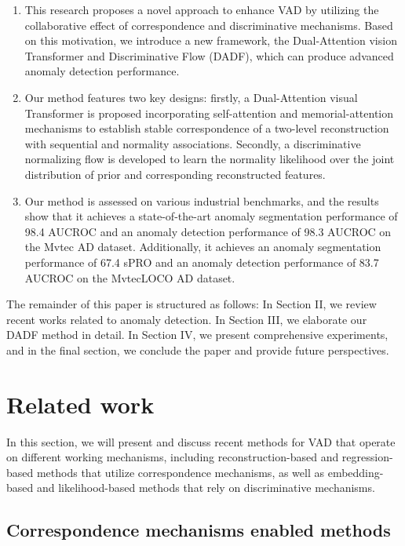 \documentclass[journal]{IEEEtran}
\begin{document}
\begin{enumerate}
\item This research proposes a novel approach to enhance VAD by utilizing the collaborative effect of correspondence and discriminative mechanisms. Based on this motivation, we introduce a new framework, the Dual-Attention vision Transformer and Discriminative Flow (DADF), which can produce advanced anomaly detection performance.

\item Our method features two key designs: firstly, a Dual-Attention visual Transformer is proposed incorporating self-attention and memorial-attention mechanisms to establish stable correspondence of a two-level reconstruction with sequential and normality associations. Secondly, a discriminative normalizing flow is developed to learn the normality likelihood over the joint distribution of prior and corresponding reconstructed features.

\item Our method is assessed on various industrial benchmarks, and the results show that it achieves a state-of-the-art anomaly segmentation performance of 98.4 AUCROC and an anomaly detection performance of 98.3 AUCROC on the Mvtec AD dataset. Additionally, it achieves an anomaly segmentation performance of 67.4 sPRO and an anomaly detection performance of 83.7 AUCROC on the MvtecLOCO AD dataset.
\end{enumerate}

The remainder of this paper is structured as follows: In Section II, we review recent works related to anomaly detection. In Section III, we elaborate our DADF method in detail. In Section IV, we present comprehensive experiments, and in the final section, we conclude the paper and provide future perspectives.

\section{Related work}

In this section, we will present and discuss recent methods for VAD that operate on different working mechanisms, including reconstruction-based and regression-based methods that utilize correspondence mechanisms, as well as embedding-based and likelihood-based methods that rely on discriminative mechanisms.

\subsection{Correspondence mechanisms enabled methods}
\end{document}
